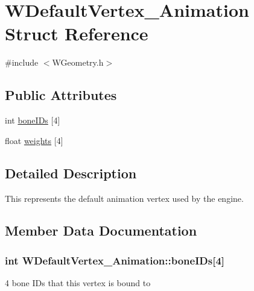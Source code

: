 \hypertarget{struct_w_default_vertex___animation}{}\section{W\+Default\+Vertex\+\_\+\+Animation Struct Reference}
\label{struct_w_default_vertex___animation}


{\ttfamily \#include $<$W\+Geometry.\+h$>$}

\subsection*{Public Attributes}
\begin{DoxyCompactItemize}
\item 
int \hyperlink{struct_w_default_vertex___animation_a313991a8fa09bbe219f0b81659221ceb}{bone\+I\+Ds} \mbox{[}4\mbox{]}
\item 
float \hyperlink{struct_w_default_vertex___animation_a613ad40e58354add4283cf2fa5b14563}{weights} \mbox{[}4\mbox{]}
\end{DoxyCompactItemize}


\subsection{Detailed Description}
This represents the default animation vertex used by the engine. 

\subsection{Member Data Documentation}
\subsubsection[{\texorpdfstring{bone\+I\+Ds}{boneIDs}}]{\setlength{\rightskip}{0pt plus 5cm}int W\+Default\+Vertex\+\_\+\+Animation\+::bone\+I\+Ds\mbox{[}4\mbox{]}}\hypertarget{struct_w_default_vertex___animation_a313991a8fa09bbe219f0b81659221ceb}{}\label{struct_w_default_vertex___animation_a313991a8fa09bbe219f0b81659221ceb}
4 bone I\+Ds that this vertex is bound to 
